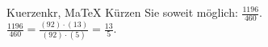 \begin{MAufgabe}{Kuerzen}{kr, MaTeX}
K\"urzen Sie soweit m\"oglich: $\frac{1196}{460}$.\\ 
\ifLsg\MLoesung
\quad $\frac{1196}{460}=\frac{(92)\cdot(13)}{(92)\cdot(5)}=\frac{13}{5}$.\else\relax\fi
 \end{MAufgabe}